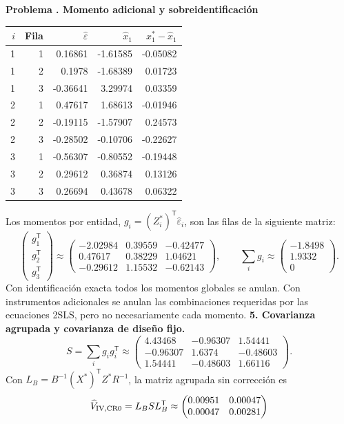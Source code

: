 \documentclass[11pt,a4paper]{article}
\newcommand{\T}{^{\mathsf T}}
\theoremstyle{definition}
\newcounter{problema}
\newenvironment{resuelto}[1]{\refstepcounter{problema}\par\medskip\Needspace{6\baselineskip}\textbf{Problema \theproblema. #1}\par}{\par\medskip}
\newcommand{\eps}{\varepsilon}
\begin{document}
\begin{resuelto}{Momento adicional y sobreidentificación}
\begin{center}\small
\begin{tabular}{rrrrr}
\toprule
$i$&Fila&$\widehat\eps$&$\widehat x_1$&$x_1^*-\widehat x_1$\\
\midrule
1&1&0.16861&-1.61585&-0.05082\\
1&2&0.1978&-1.68389&0.01723\\
1&3&-0.36641&3.29974&0.03359\\
2&1&0.47617&1.68613&-0.01946\\
2&2&-0.19115&-1.57907&0.24573\\
2&3&-0.28502&-0.10706&-0.22627\\
3&1&-0.56307&-0.80552&-0.19448\\
3&2&0.29612&0.36874&0.13126\\
3&3&0.26694&0.43678&0.06322\\
\bottomrule
\end{tabular}
\end{center}
Los momentos por entidad, $g_i=(Z_i^*)\T\widehat\eps_i$, son las filas de la siguiente matriz:
\[
\begin{pmatrix}g_1\T\\g_2\T\\g_3\T\end{pmatrix}\approx\begin{pmatrix}
-2.02984&0.39559&-0.42477\\0.47617&0.38229&1.04621\\-0.29612&1.15532&-0.62143
\end{pmatrix},\qquad \sum_i g_i\approx\begin{pmatrix}
-1.8498\\1.9332\\0
\end{pmatrix}.
\]
Con identificación exacta todos los momentos globales se anulan. Con instrumentos adicionales se anulan las combinaciones requeridas por las ecuaciones 2SLS, pero no necesariamente cada momento.
\textbf{5. Covarianza agrupada y covarianza de diseño fijo.}
\[
S=\sum_i g_ig_i\T\approx\begin{pmatrix}
4.43468&-0.96307&1.54441\\-0.96307&1.6374&-0.48603\\1.54441&-0.48603&1.66116
\end{pmatrix}.
\]
Con $L_B=B^{-1}(X^*)\T Z^*R^{-1}$, la matriz agrupada sin corrección es
\[
\widehat V_{\rm IV,CR0}=L_BSL_B\T\approx\begin{pmatrix}
0.00951&0.00047\\0.00047&0.00281

\end{pmatrix}\]
\end{resuelto}
\end{document}
